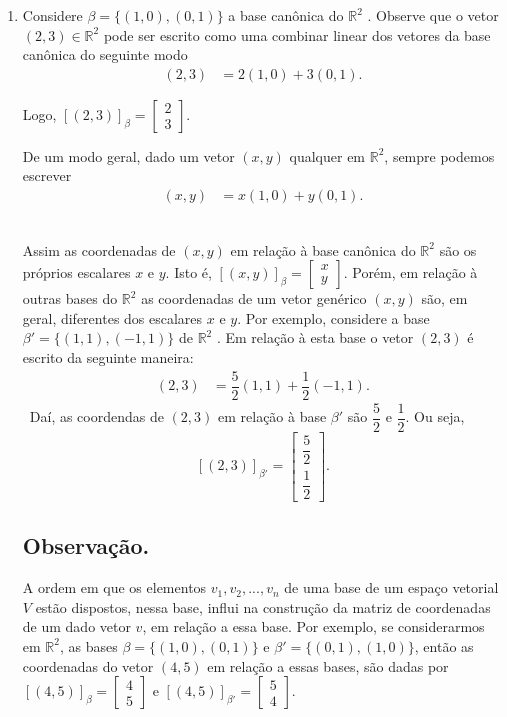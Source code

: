 \begin{enumerate}
\item Considere $\beta=\{(1,0), (0,1)\}$ a base canônica do $\mathbb{R}^2$ . Observe que o vetor $(2,3) \in \mathbb{R}^2$ pode ser escrito como uma combinar linear dos vetores da base canônica do seguinte modo
\begin{align*}
(2,3)&=2(1,0)+3(0,1).
\end{align*}

Logo, $[(2,3)]_{\beta}=\left[ \begin{array}{c}2 \\3\end{array}\right ].$

De um modo geral, dado um vetor  $(x,y)$ qualquer em $\mathbb{R}^2$, sempre podemos escrever
\begin{align*}
(x,y)&=x(1,0)+y(0,1).
\end{align*}\

Assim as coordenadas de $(x,y)$ em relação à base canônica do $\mathbb{R}^2$ são os próprios escalares $x$ e $y$. Isto é,
$[(x,y)]_{\beta}=\left[ \begin{array}{c}x\\y\end{array}\right ]$. Porém, em relação à outras bases do $\mathbb{R}^2$ as coordenadas de um vetor genérico $(x,y)$ são, em geral, diferentes dos escalares $x$ e $y$.  Por exemplo, considere a base ${\beta} ' = \{ (1,1), (-1,1)\}$  de $\mathbb{R}^2$ . Em relação à esta base o  vetor $(2,3)$ é escrito da seguinte maneira:
\begin{align*}
(2,3)&=\dfrac{5}{2}(1,1)+\dfrac{1}{2}(-1,1).
\end{align*}\
Daí, as coordendas de $(2,3)$ em relação à base ${\beta} '$ são $\dfrac{5}{2}$ e $\dfrac{1}{2}$. Ou seja,$$[(2,3)]_{\beta'}=\left[ \begin{array}{c}\dfrac{5}{2} \\\dfrac{1}{2}\end{array}\right ].$$

\subsection{Observação.} A ordem em que os elementos $v_1, v_2,..., v_n$ de uma base de um espaço vetorial $V$ estão dispostos, nessa base, influi na construção da matriz de coordenadas de um dado vetor $v$, em relação a essa base. Por exemplo, se considerarmos em $\mathbb{R}^2$, as bases $\beta=\{(1,0), (0,1)\}$ e ${\beta}'=\{(0,1), (1,0)\}$, então as coordenadas do vetor $(4,5)$ em relação a essas bases, são dadas por
$[(4,5)]_{\beta}=\left[ \begin{array}{c}4 \\5\end{array}\right ]$ e $[(4,5)]_{\beta '}=\left[ \begin{array}{c}5 \\4\end{array}\right ].$


\end{enumerate}
